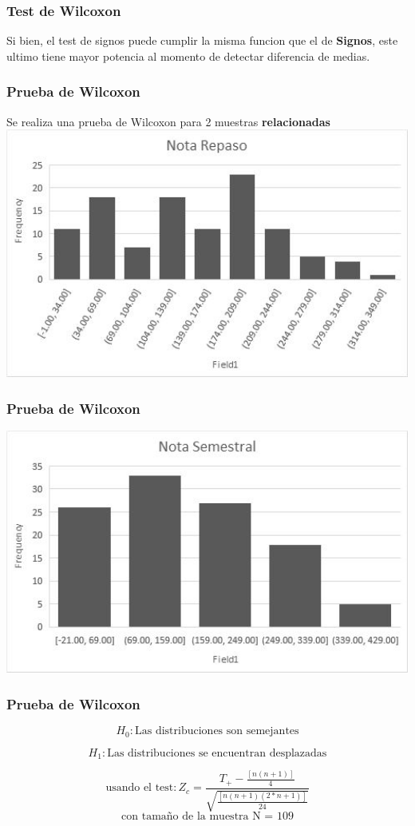 \begin{frame}
    \frametitle{Test de Wilcoxon}
    Si bien, el test de signos puede cumplir la misma funcion que el de
    \textbf{Signos}, este ultimo tiene mayor potencia al momento de
    detectar diferencia de medias.
  
\end{frame}

\begin{frame}
    \frametitle{Prueba de Wilcoxon}
    Se realiza una prueba de Wilcoxon para 2 muestras
    \textbf{relacionadas} 
    \includegraphics[width=1\textwidth]{cap/images/wilcoxon/repaso.jpg}
\end{frame}

\begin{frame}
    \frametitle{Prueba de Wilcoxon}
    \includegraphics[width=1\textwidth]{cap/images/wilcoxon/semestral.jpg}
\end{frame}

\begin{frame}

    \frametitle{Prueba de Wilcoxon}

    \[H_0: \textrm{Las distribuciones son semejantes}\]
    
    \[H_1: \textrm{Las distribuciones se encuentran desplazadas}\]

    \[\textrm{usando el test}: Z_c = \frac{T_+ - \frac{[n(n + 1)]}{4}}{\sqrt{\frac{[n(n + 1)(2 * n + 1)]}{24}}}\]
    \[\textrm{con tamaño de la muestra N = 109}\]
    

\end{frame}

